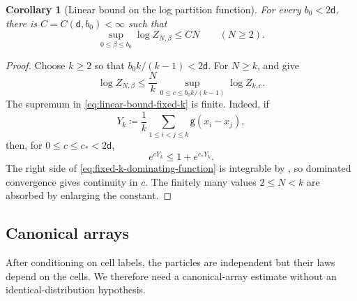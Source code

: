 \documentclass[11pt,reqno]{amsart}
\numberwithin{equation}{section}
\theoremstyle{plain}
\newtheorem{cor}[cor]{Corollary}
\theoremstyle{definition}
\renewcommand{\d}{\mathsf d}
\newcommand{\be}{\beta}
\newcommand{\g}{\mathsf g}
\begin{document}
\begin{cor}[Linear bound on the log partition function]
\label{cor:linear-partition-bound}
For every $b_0<2\d$, there is $C=C(\d,b_0)<\infty$ such that
\begin{equation}
 \sup_{0\leq\be\leq b_0}\log Z_{N,\be}
 \leq CN
 \qquad(N\geq2).
 \label{eq:linear-partition-bound}
\end{equation}
\end{cor}

\begin{proof}
Choose $k\geq2$ so that $b_0k/(k-1)<2\d$.  For $N\geq k$,  and  give
\begin{equation}
 \log Z_{N,\be}
 \leq\frac Nk
 \sup_{0\leq c\leq b_0k/(k-1)}\log Z_{k,c}.
 \label{eq:linear-bound-fixed-k}
\end{equation}
The supremum in \eqref{eq:linear-bound-fixed-k} is finite.  Indeed, if
\begin{equation}
 Y_k\coloneqq\frac1k\sum_{1\leq i<j\leq k}\g(x_i-x_j),
 \label{eq:fixed-k-energy}
\end{equation}
then, for $0\leq c\leq c_*<2\d$,
\begin{equation}
 e^{cY_k}\leq1+e^{c_*Y_k}.
 \label{eq:fixed-k-dominating-function}
\end{equation}
The right side of \eqref{eq:fixed-k-dominating-function} is integrable by , so dominated convergence gives continuity in $c$.  The finitely many values $2\leq N<k$ are absorbed by enlarging the constant.
\end{proof}

\subsection{Canonical arrays}
\label{subsec:canonical-arrays}

After conditioning on cell labels, the particles are independent but their laws depend on the cells. We therefore need a canonical-array estimate without an identical-distribution hypothesis.
\end{document}
